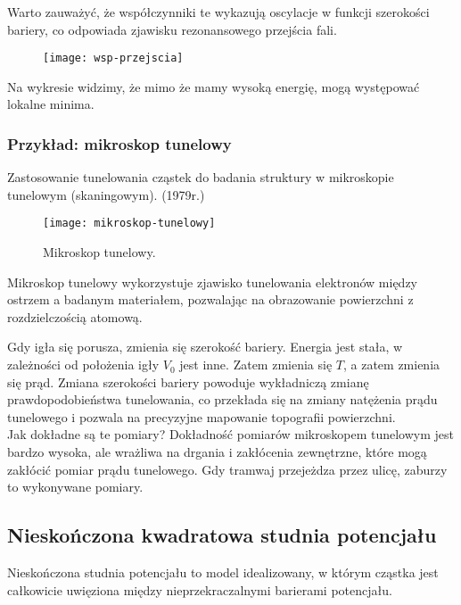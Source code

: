 Warto zauważyć, że współczynniki te wykazują oscylacje w funkcji szerokości bariery, co odpowiada zjawisku rezonansowego przejścia fali. \\

\begin{figure}[H]
    \centering
    \texttt{[image: wsp-przejscia]}
    \label{fig:wsp-przejscia}
\end{figure}

Na wykresie widzimy, że mimo że mamy wysoką energię, mogą występować lokalne minima. \\


\subsubsection{Przykład: mikroskop tunelowy}
Zastosowanie tunelowania cząstek do badania struktury w mikroskopie tunelowym (skaningowym). (1979r.) \\

\begin{figure}[H]
    \centering
    \texttt{[image: mikroskop-tunelowy]}
    \caption{Mikroskop tunelowy.}
    \label{fig:mikroskop-tunelowy}
\end{figure}

Mikroskop tunelowy wykorzystuje zjawisko tunelowania elektronów między ostrzem a badanym materiałem,
pozwalając na obrazowanie powierzchni z rozdzielczością atomową.

Gdy igła się porusza, zmienia się szerokość bariery. Energia jest stała, w zależności od położenia igły $V_0$ jest inne. Zatem zmienia się $T$,
a zatem zmienia się prąd. Zmiana szerokości bariery powoduje wykładniczą zmianę prawdopodobieństwa tunelowania, co przekłada się na zmiany
natężenia prądu tunelowego i pozwala na precyzyjne mapowanie topografii powierzchni.\\

Jak dokładne są te pomiary? Dokładność pomiarów mikroskopem tunelowym jest bardzo wysoka, ale wrażliwa na drgania i zakłócenia zewnętrzne,
które mogą zakłócić pomiar prądu tunelowego. Gdy tramwaj przejeżdza przez ulicę, zaburzy to wykonywane pomiary.



\subsection{Nieskończona kwadratowa studnia potencjału}

Nieskończona studnia potencjału to model idealizowany, w którym cząstka jest całkowicie uwięziona między nieprzekraczalnymi barierami potencjału.

